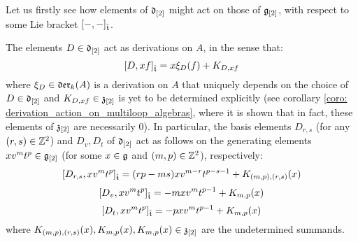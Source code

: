         Let us firstly see how elements of $\mathfrak{d}_{[2]}$ might act on those of $\mathfrak{g}_{[2]}$, with respect to some Lie bracket $[-, -]_{\hat{\mathfrak{t}}}$. 
        \begin{lemma} \label{lemma: derivation_action_on_multiloop_algebras}
            The elements $D \in \mathfrak{d}_{[2]}$ act as derivations on $A$, in the sense that:
                $$[D, xf]_{\hat{\mathfrak{t}}} = x \xi_D(f) + K_{D, xf}$$
            where $\xi_D \in \mathfrak{der}_k(A)$ is a derivation on $A$ that uniquely depends on the choice of $D \in \mathfrak{d}_{[2]}$ and $K_{D, xf} \in \mathfrak{z}_{[2]}$ is yet to be determined explicitly (see corollary \ref{coro: derivation_action_on_multiloop_algebras}, where it is shown that in fact, these elements of $\mathfrak{z}_{[2]}$ are necessarily $0$). In particular, the basis elements $D_{r, s}$ (for any $(r, s) \in \mathbb{Z}^2$) and $D_v, D_t$ of $\mathfrak{d}_{[2]}$ act as follows on the generating elements $x v^m t^p \in \mathfrak{g}_{[2]}$ (for some $x \in \mathfrak{g}$ and $(m, p) \in \mathbb{Z}^2$), respectively:
                $$[D_{r, s}, x v^m t^p]_{\hat{\mathfrak{t}}} = ( rp - ms ) x v^{m - r} t^{p - s - 1} + K_{(m, p), (r, s)}(x)$$
                $$[D_v, x v^m t^p]_{\hat{\mathfrak{t}}} = -m x v^m t^{p - 1} + K_{m, p}(x)$$
                $$[D_t, x v^m t^p]_{\hat{\mathfrak{t}}} = -p x v^m t^{p - 1} + K_{m, p}(x)$$
            where $K_{(m, p), (r, s)}(x), K_{m, p}(x), K_{m, p}(x) \in \mathfrak{z}_{[2]}$ are the undetermined summands.
        \end{lemma}
